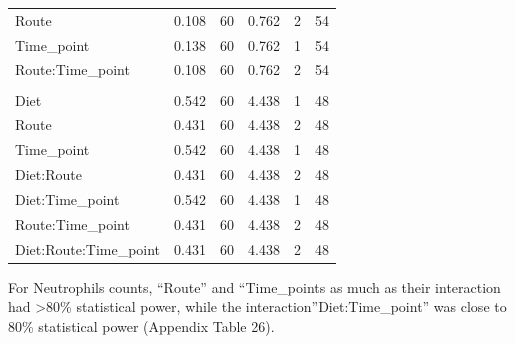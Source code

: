 \documentclass[
  12pt,
  letterpaper,
]{article}
\begin{document}
\begin{longtable}{l|rrrrr}
\midrule\addlinespace[2.5pt]
Route & 0.108 & 60 & 0.762 & 2 & 54 \\ 
Time\_point & 0.138 & 60 & 0.762 & 1 & 54 \\ 
Route:Time\_point & 0.108 & 60 & 0.762 & 2 & 54 \\ 
\midrule\addlinespace[2.5pt]
\multicolumn{6}{l}{Diet:Route:Time\_point} \\ 
\midrule\addlinespace[2.5pt]
Diet & 0.542 & 60 & 4.438 & 1 & 48 \\ 
Route & 0.431 & 60 & 4.438 & 2 & 48 \\ 
Time\_point & 0.542 & 60 & 4.438 & 1 & 48 \\ 
Diet:Route & 0.431 & 60 & 4.438 & 2 & 48 \\ 
Diet:Time\_point & 0.542 & 60 & 4.438 & 1 & 48 \\ 
Route:Time\_point & 0.431 & 60 & 4.438 & 2 & 48 \\ 
Diet:Route:Time\_point & 0.431 & 60 & 4.438 & 2 & 48 \\ 
\bottomrule
\end{longtable}

For Neutrophils counts, ``Route'' and ``Time\_points as much as their interaction had \textgreater80\% statistical power, while the interaction''Diet:Time\_point'' was close to 80\% statistical power (Appendix Table 26).
\end{document}
